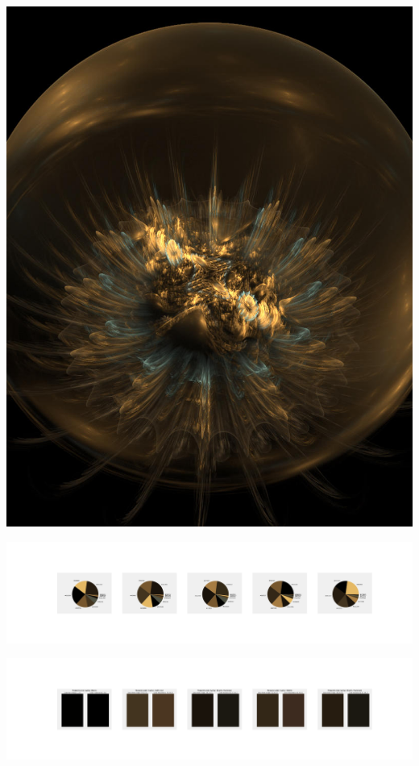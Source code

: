 \documentclass[11pt]{article}
\begin{document}
\begin{landscape}
    \begin{center}
    \includegraphics[width=\textwidth]{./nbimg/file (18).jpg}
    \end{center}

    \begin{center}
    \includegraphics[width=250mm]{./nbimg/pie-89.jpg}
    \end{center}

    \begin{center}
    \includegraphics[width=250mm]{./nbimg/peak-89.jpg}
    \end{center}
    


\end{landscape}
\end{document}
